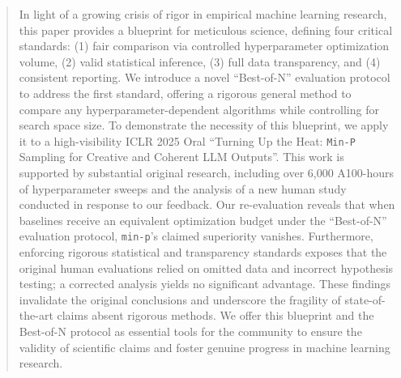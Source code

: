 \documentclass{article} %
\begin{document}
\begin{abstract}
In light of a growing crisis of rigor in empirical machine learning research, this paper provides a blueprint for meticulous science, defining four critical standards: (1) fair comparison via controlled hyperparameter optimization volume, (2) valid statistical inference, (3) full data transparency, and (4) consistent reporting.
We introduce a novel ``Best-of-N'' evaluation protocol to address the first standard, offering a rigorous general method to compare any hyperparameter-dependent algorithms while controlling for search space size.
To demonstrate the necessity of this blueprint, we apply it to a high-visibility ICLR 2025 Oral ``Turning Up the Heat: \texttt{Min-P} Sampling for Creative and Coherent LLM Outputs''.
This work is supported by substantial original research, including over 6,000 A100-hours of hyperparameter sweeps and the analysis of a new human study conducted in response to our feedback.
Our re-evaluation reveals that when baselines receive an equivalent optimization budget under the ``Best-of-N'' evaluation protocol, \texttt{min-p}'s claimed superiority vanishes.
Furthermore, enforcing rigorous statistical and transparency standards exposes that the original human evaluations relied on omitted data and incorrect hypothesis testing; a corrected analysis yields no significant advantage.
These findings invalidate the original conclusions and underscore the fragility of state-of-the-art claims absent rigorous methods. We offer this blueprint and the Best-of-N protocol as essential tools for the community to ensure the validity of scientific claims and foster genuine progress in machine learning research.
\end{abstract}







\clearpage


\clearpage




\clearpage
\appendix
\onecolumn

\end{document}
